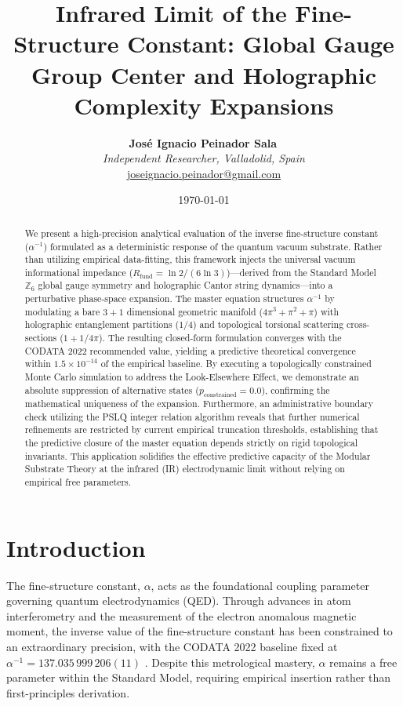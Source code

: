 \documentclass[12pt,a4paper]{article}
\title{Infrared Limit of the Fine-Structure Constant: Global Gauge Group Center and Holographic Complexity Expansions}
\author{
  \textbf{José Ignacio Peinador Sala}\,\orcidlink{0009-0008-1822-3452} \\
  \textit{Independent Researcher, Valladolid, Spain} \\
  \small\href{mailto:joseignacio.peinador@gmail.com}{joseignacio.peinador@gmail.com}
}
\date{\today}
\begin{document}
\maketitle


\begin{abstract}
We present a high-precision analytical evaluation of the inverse fine-structure constant ($\alpha^{-1}$) formulated as a deterministic response of the quantum vacuum substrate. Rather than utilizing empirical data-fitting, this framework injects the universal vacuum informational impedance ($R_{\text{fund}} = \ln 2 / (6 \ln 3)$)—derived from the Standard Model $\mathbb{Z}_6$ global gauge symmetry and holographic Cantor string dynamics—into a perturbative phase-space expansion. The master equation structures $\alpha^{-1}$ by modulating a bare $3+1$ dimensional geometric manifold ($4\pi^3 + \pi^2 + \pi$) with holographic entanglement partitions ($1/4$) and topological torsional scattering cross-sections ($1 + 1/4\pi$). The resulting closed-form formulation converges with the CODATA 2022 recommended value, yielding a predictive theoretical convergence within $1.5 \times 10^{-14}$ of the empirical baseline. By executing a topologically constrained Monte Carlo simulation to address the Look-Elsewhere Effect, we demonstrate an absolute suppression of alternative states ($p_{\text{constrained}} = 0.0$), confirming the mathematical uniqueness of the expansion. Furthermore, an administrative boundary check utilizing the PSLQ integer relation algorithm reveals that further numerical refinements are restricted by current empirical truncation thresholds, establishing that the predictive closure of the master equation depends strictly on rigid topological invariants. This application solidifies the effective predictive capacity of the Modular Substrate Theory at the infrared (IR) electrodynamic limit without relying on empirical free parameters.
\end{abstract}


\section{Introduction}

The fine-structure constant, $\alpha$, acts as the foundational coupling parameter governing quantum electrodynamics (QED). Through advances in atom interferometry and the measurement of the electron anomalous magnetic moment, the inverse value of the fine-structure constant has been constrained to an extraordinary precision, with the CODATA 2022 baseline fixed at $\alpha^{-1} = 137.035\,999\,206(11)$ \cite{codata2022}. Despite this metrological mastery, $\alpha$ remains a free parameter within the Standard Model, requiring empirical insertion rather than first-principles derivation.
\end{document}
